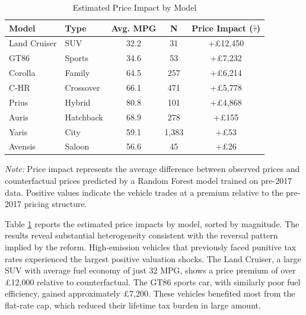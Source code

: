 \documentclass[12pt, a4paper]{article}
\begin{document}
\begin{table}[ht]
    \centering
    \caption{Estimated Price Impact by Model}
    \label{tab:hetero_impact}
    \begin{threeparttable}
    \begin{tabular}{llccc}
        \toprule
        Model & Type & Avg. MPG & N & Price Impact ($\hat{\tau}$) \\
        \midrule
        Land Cruiser & SUV & 32.2 & 31 & +\pounds 12,450 \\
        GT86 & Sports & 34.6 & 53 & +\pounds 7,232 \\
        Corolla & Family & 64.5 & 257 & +\pounds 6,214 \\
        C-HR & Crossover & 66.1 & 471 & +\pounds 5,778 \\
        Prius & Hybrid & 80.8 & 101 & +\pounds 4,868 \\
        Auris & Hatchback & 68.9 & 278 & +\pounds 155 \\
        Yaris & City & 59.1 & 1,383 & +\pounds 53 \\
        Avensis & Saloon & 56.6 & 45 & +\pounds 26 \\
        \bottomrule
    \end{tabular}
    \begin{tablenotes}
        \small
        \item \textit{Note:} Price impact represents the average difference between observed prices and counterfactual prices predicted by a Random Forest model trained on pre-2017 data. Positive values indicate the vehicle trades at a premium relative to the pre-2017 pricing structure.
    \end{tablenotes}
    \end{threeparttable}
\end{table}

Table \ref{tab:hetero_impact} reports the estimated price impacts by model, sorted by magnitude. The results reveal substantial heterogeneity consistent with the reversal pattern implied by the reform. High-emission vehicles that previously faced punitive tax rates experienced the largest positive valuation shocks. The Land Cruiser, a large SUV with average fuel economy of just 32 MPG, shows a price premium of over \pounds 12,000 relative to counterfactual. The GT86 sports car, with similarly poor fuel efficiency, gained approximately \pounds 7,200. These vehicles benefited most from the flat-rate cap, which reduced their lifetime tax burden in large amount.
\end{document}
